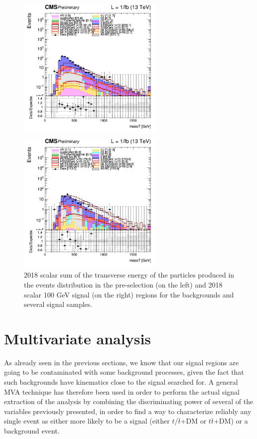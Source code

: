 \documentclass[a4paper, 10pt, openright]{report}
\begin{document}
\begin{itemize}
\begin{figure}[htbp]
\centering
\begin{minipage}[b]{.48\textwidth}
\includegraphics[width=7cm, height=7cm]{figs/2018/log_cratio_topCR_ll_massT.png}
\end{minipage}\hfill
\begin{minipage}[b]{.48\textwidth}
\includegraphics[width=7cm, height=7cm]{figs/2018/log_cratio_topCR_ll_DNN_signal0_scalar100_massT.png}
\end{minipage} \hfill
\caption{2018 scalar sum of the transverse energy of the particles produced in the events distribution in the pre-selection (on the left) and 2018 scalar 100 GeV signal (on the right) regions for the backgrounds and several signal samples.}
\label{fig:SRdisc6}
\end{figure}
\end{itemize}

\section{Multivariate analysis} \label{section:NN}

As already seen in the previous sections, we know that our signal regions are going to be contaminated with some background processes, given the fact that such backgrounds have kinematics close to the signal searched for. A general \acf{MVA} technique has therefore been used in order to perform the actual signal extraction of the analysis by combining the discriminating power of several of the variables previously presented, in order to find a way to characterize reliably any single event as either more likely to be a signal (either $t/\bar t$+DM or $t \bar t$+DM) or a background event.
\end{document}
